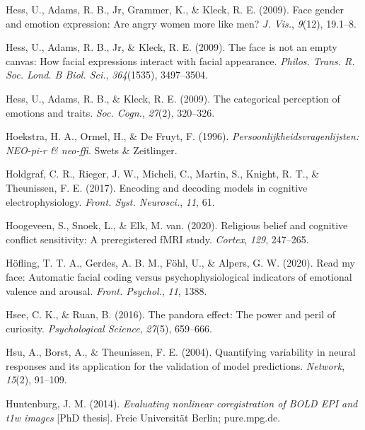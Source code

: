 \documentclass[11pt,american,a4paper,oneside,]{memoir} %
\begin{document}
\leavevmode\hypertarget{ref-Hess2009-jz}{}%
Hess, U., Adams, R. B., Jr, Grammer, K., \& Kleck, R. E. (2009). Face gender and emotion expression: Are angry women more like men? \emph{J. Vis.}, \emph{9}(12), 19.1--8.

\leavevmode\hypertarget{ref-Hess2009-xo}{}%
Hess, U., Adams, R. B., Jr, \& Kleck, R. E. (2009). The face is not an empty canvas: How facial expressions interact with facial appearance. \emph{Philos. Trans. R. Soc. Lond. B Biol. Sci.}, \emph{364}(1535), 3497--3504.

\leavevmode\hypertarget{ref-Hess2009-br}{}%
Hess, U., Adams, R. B., \& Kleck, R. E. (2009). The categorical perception of emotions and traits. \emph{Soc. Cogn.}, \emph{27}(2), 320--326.

\leavevmode\hypertarget{ref-Hoekstra1996-kv}{}%
Hoekstra, H. A., Ormel, H., \& De Fruyt, F. (1996). \emph{Persoonlijkheidsvragenlijsten: NEO-pi-r \& neo-ffi}. Swets \& Zeitlinger.

\leavevmode\hypertarget{ref-Holdgraf2017-eu}{}%
Holdgraf, C. R., Rieger, J. W., Micheli, C., Martin, S., Knight, R. T., \& Theunissen, F. E. (2017). Encoding and decoding models in cognitive electrophysiology. \emph{Front. Syst. Neurosci.}, \emph{11}, 61.

\leavevmode\hypertarget{ref-Hoogeveen2020-qp}{}%
Hoogeveen, S., Snoek, L., \& Elk, M. van. (2020). Religious belief and cognitive conflict sensitivity: A preregistered fMRI study. \emph{Cortex}, \emph{129}, 247--265.

\leavevmode\hypertarget{ref-Hofling2020-mk}{}%
Höfling, T. T. A., Gerdes, A. B. M., Föhl, U., \& Alpers, G. W. (2020). Read my face: Automatic facial coding versus psychophysiological indicators of emotional valence and arousal. \emph{Front. Psychol.}, \emph{11}, 1388.

\leavevmode\hypertarget{ref-hsee2016pandora}{}%
Hsee, C. K., \& Ruan, B. (2016). The pandora effect: The power and peril of curiosity. \emph{Psychological Science}, \emph{27}(5), 659--666.

\leavevmode\hypertarget{ref-Hsu2004-hs}{}%
Hsu, A., Borst, A., \& Theunissen, F. E. (2004). Quantifying variability in neural responses and its application for the validation of model predictions. \emph{Network}, \emph{15}(2), 91--109.

\leavevmode\hypertarget{ref-Huntenburg2014-ps}{}%
Huntenburg, J. M. (2014). \emph{Evaluating nonlinear coregistration of BOLD EPI and t1w images} {[}PhD thesis{]}. Freie Universität Berlin; pure.mpg.de.
\end{document}
